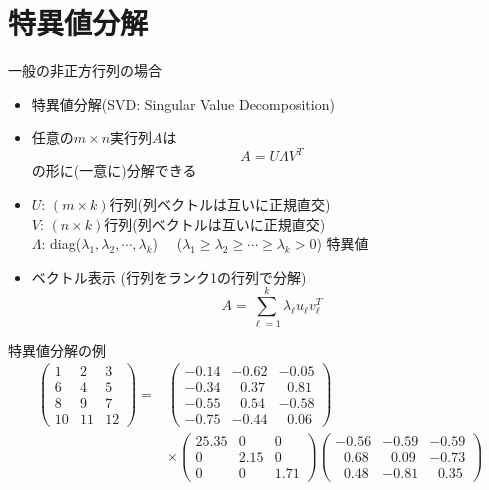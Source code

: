\section{特異値分解}

\begin{frame}[t,fragile]{一般の非正方行列の場合}
  \begin{itemize}
  \item 特異値分解(SVD: Singular Value Decomposition)
  \item 任意の$m \times n$実行列$A$は
    \[
    A = U \Lambda V^T
    \]
    の形に(一意に)分解できる
  \item $U$: $(m \times k)$行列(列ベクトルは互いに正規直交) \\
    $V$: $(n \times k)$行列(列ベクトルは互いに正規直交) \\
    $\Lambda$: diag($\lambda_1,\lambda_2,\cdots,\lambda_k$) \ \ ($\lambda_1\ge\lambda_2\ge\cdots\ge\lambda_k>0$) 特異値
  \item ベクトル表示 (行列をランク1の行列で分解)
    \[
    A = \sum_{\ell=1}^k \lambda_\ell u_\ell v_\ell^{T}
    \]
  \end{itemize}
\end{frame}

\begin{frame}[t,fragile]{特異値分解の例}
  \[
  \begin{split}
    \begin{pmatrix}
      1 & 2 & 3 \\
      6 & 4 & 5 \\
      8 & 9 & 7 \\
      10 & 11 & 12
    \end{pmatrix} =&
    \begin{pmatrix}
      -0.14 & -0.62 & -0.05 \\
      -0.34 & \ \ \,0.37 & \ \ \,0.81 \\
      -0.55 & \ \ \,0.54 & -0.58 \\
      -0.75 & -0.44 & \ \ \,0.06      
    \end{pmatrix} \\
    &\times
    \begin{pmatrix}
      25.35 & 0 & 0 \\
      0 & 2.15 & 0 \\
      0 & 0 & 1.71
    \end{pmatrix}
    \begin{pmatrix}
      -0.56 & -0.59 & -0.59 \\
      \ \ \,0.68 & \ \ \,0.09 & -0.73 \\
      \ \ \,0.48 & -0.81 & \ \ \,0.35
    \end{pmatrix}
  \end{split}
  \]
\end{frame}

